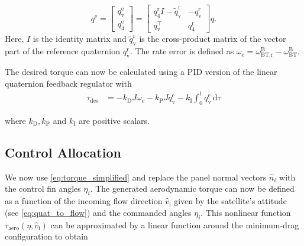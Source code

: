 \documentclass[pdflatex,sn-mathphys-num]{sn-jnl}%
\theoremstyle{thmstyleone}%
\theoremstyle{thmstyletwo}%
\theoremstyle{thmstylethree}%
\begin{document}
	\newcommand{\tr}{\text{r}}
	\newcommand{\tO}{\text{}}
	\newcommand{\te}{\text{e}}
	\begin{equation}
		\label{eq:error_quaternion}
		q^{\te}
		= \begin{bmatrix}
			q_{\text{v}}^{\te} \\
			q_{4}^{\te}
		\end{bmatrix} 
		= \begin{bmatrix}
			q_{4}^{\tr} I - \tilde{q}_{\text{v}}^{\tr} & - q_{\text{v}}^{\tr} \\
			q_{\text{v}}^\intercal & q_{4}^{\tr}
		\end{bmatrix}
		q.
	\end{equation}
	Here, $I$ is the identity matrix and $\tilde{q}_{\text{v}}^{\tr}$ is the cross-product matrix of the vector part of the reference quaternion $q_{\text{v}}^{\tr}$. 
	The rate error is defined as $\omega_{\te} = \omega_{\text{BT,r}}^{\text{B}} - \omega_{\text{BT}}^{\text{B}}$.

	The desired torque can now be calculated using a PID version of the linear quaternion feedback regulator \cite{wieQuaternionFeedbackRegulator1989} with
	\begin{equation}
		\begin{aligned}
			\tau_{\text{des}} &= 
			- k_{\text{D}} J \omega_{\te}
			- k_{\text{P}} J q_{\text{v}}^{\te}
			- k_{\text{I}} \int_{0}^{t} q_{\text{v}}^{\te} \, \mathrm{d}\tau
		\end{aligned}
	\end{equation}

	where $k_{\text{D}}, k_{\text{P}}$ and $k_{\text{I}}$ are positive scalars.

	\subsection{Control Allocation}
	We now use \cref{eq:torque_simplified} and replace the panel normal vectors $\hat{n}_i$ with the control fin angles $\eta_i$. The generated aerodynamic torque can now be defined as a function of the incoming flow direction $\hat{v}_{\text{i}}$ given by the satellite's attitude (see \cref{eq:quat_to_flow}) and the commanded angles $\eta_i$. 
	This nonlinear function $\tau_{\text{aero}}(\eta,\hat{v}_{\text{i}})$ can be approximated by a linear function around the minimum-drag configuration to obtain
\end{document}
